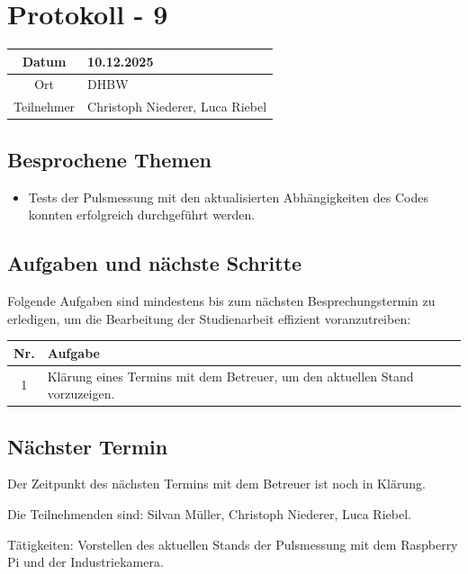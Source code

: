 \chapter{Protokoll - 9}

\begin{table}[H]
    \centering
    \begin{tabular}{|c|l|}
        \hline
        Datum& 10.12.2025 \\
        \hline
        Ort& DHBW\\
        \hline
        Teilnehmer& Christoph Niederer, Luca Riebel\\
        \hline
    \end{tabular}
\end{table}

\section{Besprochene Themen}
\begin{itemize}
    \item Tests der Pulsmessung mit den aktualisierten Abhängigkeiten des Codes konnten erfolgreich durchgeführt werden.
\end{itemize}

\section{Aufgaben und nächste Schritte}
Folgende Aufgaben sind mindestens bis zum nächsten Besprechungstermin zu erledigen, um die Bearbeitung der Studienarbeit effizient voranzutreiben:

\begin{table}[H]
    \centering
    \begin{tabular}{|c|p{12cm}|}
        \hline
        \textbf{Nr.} & \textbf{Aufgabe}\\
        \hline
        1 & Klärung eines Termins mit dem Betreuer, um den aktuellen Stand vorzuzeigen. \\
        \hline
    \end{tabular}
\end{table}

\section{Nächster Termin}
Der Zeitpunkt des nächsten Termins mit dem Betreuer ist noch in Klärung.

Die Teilnehmenden sind: Silvan Müller, Christoph Niederer, Luca Riebel.

Tätigkeiten: Vorstellen des aktuellen Stands der Pulsmessung mit dem Raspberry Pi und der Industriekamera.
